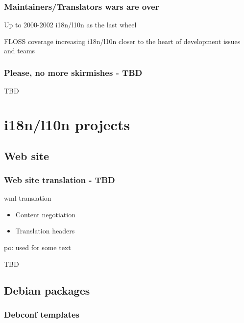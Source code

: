 \documentclass{beamer}
\begin{document}
\begin{frame}
  \frametitle{Maintainers/Translators wars are over}
	\begin{block}
		{Up to 2000-2002}
		i18n/l10n as the last wheel
	\end{block}
	\begin{block}
		{FLOSS coverage increasing}
		i18n/l10n closer to the heart of development issues and teams
	\end{block}
\end{frame}

\begin{frame}
  \frametitle{Please, no more skirmishes - TBD}
	\begin{block}
		TBD
	\end{block}
\end{frame}


\section{i18n/l10n projects}

\subsection{Web site}

\begin{frame}
  \frametitle{Web site translation - TBD}
	\begin{block}
		{wml translation}
		\begin{itemize}
		\item Content negotiation
		\item Translation headers
		\end{itemize}
	\end{block}
	\begin{block}
		{po: used for some text}
	\end{block}
	\begin{block}
		{TBD}
	\end{block}
\end{frame}


\subsection{Debian packages}

\subsubsection{Debconf templates}
\end{document}
